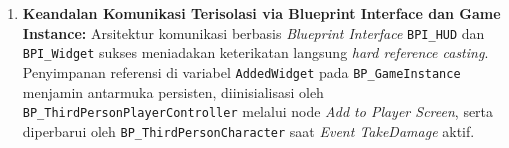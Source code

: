 \documentclass[a4paper,oneside,11pt]{book}
\begin{document}
\begin{enumerate}[label=\alph*.]
  \item \textbf{Keandalan Komunikasi Terisolasi via Blueprint Interface dan Game Instance:} Arsitektur komunikasi berbasis \textit{Blueprint Interface} \texttt{BPI\_HUD} dan \texttt{BPI\_Widget} sukses meniadakan keterikatan langsung \textit{hard reference casting}. Penyimpanan referensi di variabel \texttt{AddedWidget} pada \texttt{BP\_GameInstance} menjamin antarmuka persisten, diinisialisasi oleh \texttt{BP\_ThirdPersonPlayerController} melalui node \textit{Add to Player Screen}, serta diperbarui oleh \texttt{BP\_ThirdPersonCharacter} saat \textit{Event TakeDamage} aktif.
\end{enumerate}
\end{document}
